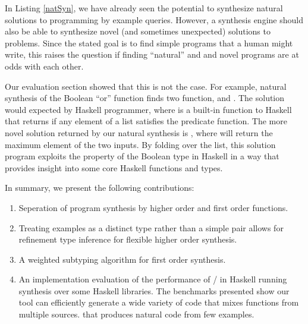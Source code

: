 In Listing \ref{natSyn}, we have already seen the potential to synthesize natural solutions to programming by example queries.
However, a synthesis engine should also be able to synthesize novel (and sometimes unexpected) solutions to problems.
Since the stated goal is to find simple programs that a human might write, this raises the question if finding ``natural'' and and novel programs are at odds with each other.

Our evaluation section showed that this is not the case.
For example, natural synthesis of the Boolean ``or'' function finds two function,  and .
The  solution would expected by Haskell programmer, where  is a built-in function to Haskell that returns  if any element of a list satisfies the predicate function.
The more novel solution returned by our natural synthesis is , where  will return the maximum element of the two inputs.
By folding over the list, this solution program exploits the  property of the Boolean type in Haskell in a way that provides insight into some core Haskell functions and types.

In summary, we present the following contributions:

\begin{enumerate}
\item Seperation of program synthesis by higher order and first order functions.
\item Treating examples as a distinct type rather than a simple pair allows for refinement type inference for flexible higher order synthesis.
\item A weighted subtyping algorithm for first order synthesis.
\item An implementation evaluation of the performance of \ourTool/ in Haskell running synthesis over some Haskell libraries. The benchmarks presented show our tool can efficiently generate a wide variety of code that mixes functions from multiple sources. that produces natural code from few examples.
\end{enumerate}
